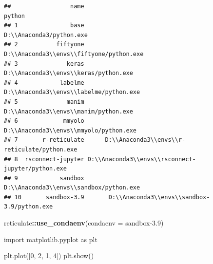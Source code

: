 \documentclass[
]{book}
\newenvironment{Shaded}{\begin{snugshade}}{\end{snugshade}}
\newcommand{\AttributeTok}[1]{\textcolor[rgb]{0.13,0.29,0.53}{#1}}
\newcommand{\DecValTok}[1]{\textcolor[rgb]{0.00,0.00,0.81}{#1}}
\newcommand{\FunctionTok}[1]{\textcolor[rgb]{0.13,0.29,0.53}{\textbf{#1}}}
\newcommand{\ImportTok}[1]{#1}
\newcommand{\NormalTok}[1]{#1}
\newcommand{\SpecialCharTok}[1]{\textcolor[rgb]{0.81,0.36,0.00}{\textbf{#1}}}
\newcommand{\StringTok}[1]{\textcolor[rgb]{0.31,0.60,0.02}{#1}}
\theoremstyle{definition}
\theoremstyle{definition}
\theoremstyle{definition}
\theoremstyle{definition}
\theoremstyle{remark}
\begin{document}
\begin{verbatim}
##                 name                                            python
## 1               base                          D:\\Anaconda3/python.exe
## 2           fiftyone          D:\\Anaconda3\\envs\\fiftyone/python.exe
## 3              keras             D:\\Anaconda3\\envs\\keras/python.exe
## 4            labelme           D:\\Anaconda3\\envs\\labelme/python.exe
## 5              manim             D:\\Anaconda3\\envs\\manim/python.exe
## 6             mmyolo            D:\\Anaconda3\\envs\\mmyolo/python.exe
## 7       r-reticulate      D:\\Anaconda3\\envs\\r-reticulate/python.exe
## 8  rsconnect-jupyter D:\\Anaconda3\\envs\\rsconnect-jupyter/python.exe
## 9            sandbox           D:\\Anaconda3\\envs\\sandbox/python.exe
## 10       sandbox-3.9       D:\\Anaconda3\\envs\\sandbox-3.9/python.exe
\end{verbatim}

\begin{Shaded}
\begin{Highlighting}[]
\NormalTok{reticulate}\SpecialCharTok{::}\FunctionTok{use\_condaenv}\NormalTok{(}\AttributeTok{condaenv =} \StringTok{\textquotesingle{}sandbox{-}3.9\textquotesingle{}}\NormalTok{)}
\end{Highlighting}
\end{Shaded}

\begin{Shaded}
\begin{Highlighting}[]
\ImportTok{import}\NormalTok{ matplotlib.pyplot }\ImportTok{as}\NormalTok{ plt}

\NormalTok{plt.plot([}\DecValTok{0}\NormalTok{, }\DecValTok{2}\NormalTok{, }\DecValTok{1}\NormalTok{, }\DecValTok{4}\NormalTok{])}
\NormalTok{plt.show()}
\end{Highlighting}
\end{Shaded}
\end{document}
